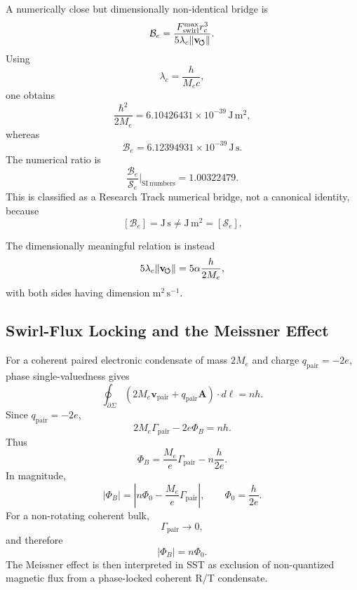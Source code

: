         A numerically close but dimensionally non-identical bridge is
        \[
            \mathcal B_e
            =
            \frac{F_{\text{swirl}}^{\max} r_c^3}
            {5\lambda_c\|\mathbf{v}_{\!\boldsymbol{\circlearrowleft}}\|}.
        \]
        Using
        \[
            \lambda_c=\frac{h}{M_e c},
        \]
        one obtains
        \[
            \frac{\hbar^2}{2M_e}
            =
            6.10426431\times10^{-39}\,\mathrm{J\,m^2},
        \]
        whereas
        \[
            \mathcal B_e
            =
            6.12394931\times10^{-39}\,\mathrm{J\,s}.
        \]
        The numerical ratio is
        \[
            \frac{\mathcal B_e}{\mathcal S_e}\bigg|_{\mathrm{SI\ numbers}}
            =
            1.00322479.
        \]
        This is classified as a Research Track numerical bridge, not a canonical
        identity, because
        \[
            [\mathcal B_e]=\mathrm{J\,s}
            \neq
            \mathrm{J\,m^2}=[\mathcal S_e].
        \]
        
        The dimensionally meaningful relation is instead
        \[
            5\lambda_c\|\mathbf{v}_{\!\boldsymbol{\circlearrowleft}}\|
            =
            5\alpha\frac{h}{2M_e},
        \]
        with both sides having dimension \(\mathrm{m^2\,s^{-1}}\).
    
    \subsection{Swirl-Flux Locking and the Meissner Effect}
        
        For a coherent paired electronic condensate of mass \(2M_e\) and charge
        \(q_{\mathrm{pair}}=-2e\), phase single-valuedness gives
        \[
            \oint_{\partial\Sigma}
            \left(
                2M_e\mathbf v_{\mathrm{pair}}
                +
                q_{\mathrm{pair}}\mathbf A
            \right)\cdot d\boldsymbol\ell
            =
            nh .
        \]
        Since \(q_{\mathrm{pair}}=-2e\),
        \[
            2M_e\Gamma_{\mathrm{pair}}
            -
            2e\Phi_B
            =
            nh .
        \]
        Thus
        \[
            \Phi_B
            =
            \frac{M_e}{e}\Gamma_{\mathrm{pair}}
            -
            n\frac{h}{2e}.
        \]
        In magnitude,
        \[
            |\Phi_B|
            =
            \left|
                n\Phi_0
            -
                \frac{M_e}{e}\Gamma_{\mathrm{pair}}
            \right|,
            \qquad
            \Phi_0=\frac{h}{2e}.
        \]
        For a non-rotating coherent bulk,
        \[
            \Gamma_{\mathrm{pair}}\to 0,
        \]
        and therefore
        \[
            |\Phi_B|=n\Phi_0.
        \]
        The Meissner effect is then interpreted in SST as exclusion of non-quantized
        magnetic flux from a phase-locked coherent R/T condensate.
    
